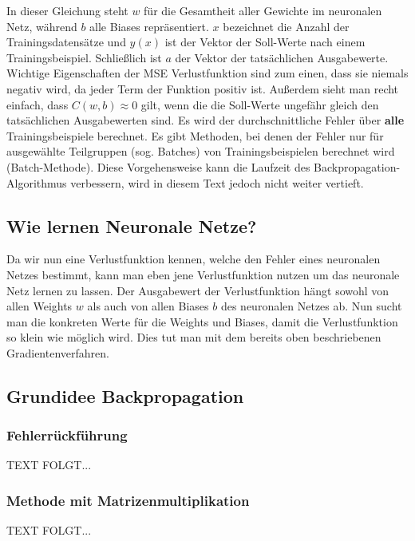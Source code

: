 \noindent
In dieser Gleichung steht $w$ für die Gesamtheit aller Gewichte im neuronalen Netz, während $b$ alle Biases repräsentiert.
$x$ bezeichnet die Anzahl der Trainingsdatensätze und $y(x)$ ist der Vektor der Soll-Werte nach einem Trainingsbeispiel.
Schließlich ist $a$ der Vektor der tatsächlichen Ausgabewerte. 
\bigbreak\noindent
Wichtige Eigenschaften der MSE Verlustfunktion sind zum einen, dass sie niemals negativ wird, da jeder Term der Funktion positiv ist.
Außerdem sieht man recht einfach, dass $C(w, b) \approx 0$ gilt, wenn die die Soll-Werte ungefähr gleich den tatsächlichen Ausgabewerten sind.
\bigbreak\noindent
Es wird der durchschnittliche Fehler über \textbf{alle} Trainingsbeispiele berechnet. 
Es gibt Methoden, bei denen der Fehler nur für ausgewählte Teilgruppen (sog. Batches) von Trainingsbeispielen berechnet wird (Batch-Methode). 
Diese Vorgehensweise kann die Laufzeit des Backpropagation-Algorithmus verbessern, wird in diesem Text jedoch nicht weiter vertieft.

\subsection{Wie lernen Neuronale Netze?}\label{subsec:backpropagation:lernen_nn}
Da wir nun eine Verlustfunktion kennen, welche den Fehler eines neuronalen Netzes bestimmt, kann man eben jene
Verlustfunktion nutzen um das neuronale Netz lernen zu lassen. Der Ausgabewert der Verlustfunktion hängt sowohl von allen Weights $w$ 
als auch von allen Biases $b$ des neuronalen Netzes ab. Nun sucht man die konkreten Werte für die Weights und Biases, damit die 
Verlustfunktion so klein wie möglich wird. Dies tut man mit dem bereits oben beschriebenen Gradientenverfahren.

\subsection{Grundidee Backpropagation}\label{subsec:backpropagation:grundiee}
\subsubsection{Fehlerrückführung}\label{subsec:backpropagation:fehlerrueckfuehrung}
  TEXT FOLGT...

\subsubsection{Methode mit Matrizenmultiplikation}\label{subsec:backpropagation:matrizen}
  TEXT FOLGT...

